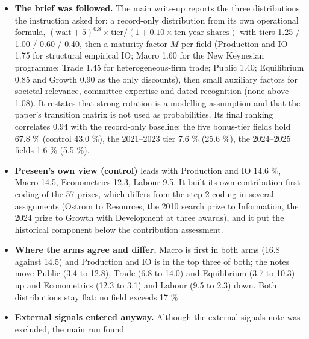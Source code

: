 \documentclass[11pt,a4paper]{article}
\newcommand{\code}[1]{\texttt{#1}}
\begin{document}
\begin{table}[h]
\centering
\small
\resizebox{\textwidth}{!}{}
\caption{Preseen's probability per field, control (no context) against main (nine notes as \code{assume\_true}),
with the record-only baseline rank and tier of Table~\ref{tab:h14}. Spearman main--control 0.43, main--baseline
0.94, control--baseline 0.27; entropy main 2.36, control 2.48, uniform 2.64.}
\label{tab:res14}
\end{table}

\begin{itemize}
\item \textbf{The brief was followed.} The main write-up reports the three distributions the instruction asked for:
  a record-only distribution from its own operational formula, $(\text{wait}+5)^{0.8} \times \text{tier} /
  (1 + 0.10 \times \text{ten-year shares})$ with tiers 1.25 / 1.00 / 0.60 / 0.40, then a maturity factor $M$ per field
  (Production and IO 1.75 for structural empirical IO; Macro 1.60 for the New Keynesian programme; Trade 1.45 for
  heterogeneous-firm trade; Public 1.40; Equilibrium 0.85 and Growth 0.90 as the only discounts), then small auxiliary
  factors for societal relevance, committee expertise and dated recognition (none above 1.08). It restates that
  strong rotation is a modelling assumption and that the paper's transition matrix is not used as probabilities.
  Its final ranking correlates 0.94 with the record-only baseline; the five bonus-tier fields hold 67.8 \% (control
  43.0 \%), the 2021--2023 tier 7.6 \% (25.6 \%), the 2024--2025 fields 1.6 \% (5.5 \%).
\item \textbf{Preseen's own view (control)} leads with Production and IO 14.6 \%, Macro 14.5, Econometrics 12.3,
  Labour 9.5. It built its own contribution-first coding of the 57 prizes, which differs from the step-2 coding in
  several assignments (Ostrom to Resources, the 2010 search prize to Information, the 2024 prize to Growth with
  Development at three awards), and it put the historical component below the contribution assessment.
\item \textbf{Where the arms agree and differ.} Macro is first in both arms (16.8 against 14.5) and Production and
  IO is in the top three of both; the notes move Public (3.4 to 12.8), Trade (6.8 to 14.0) and Equilibrium (3.7 to
  10.3) up and Econometrics (12.3 to 3.1) and Labour (9.5 to 2.3) down. Both distributions stay flat: no field
  exceeds 17 \%.
\item \textbf{External signals entered anyway.} Although the external-signals note was excluded, the main run found

\end{itemize}
\end{document}
